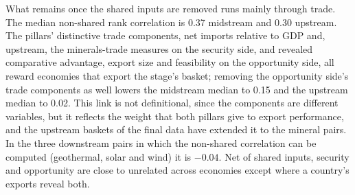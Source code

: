 What remains once the shared inputs are removed runs mainly through trade. The median non-shared
rank correlation is 0.37 midstream and 0.30 upstream. The pillars' distinctive trade components,
net imports relative to GDP and, upstream, the minerals-trade measures on the security side, and
revealed comparative advantage, export size and feasibility on the opportunity side, all reward
economies that export the stage's basket; removing the opportunity side's trade components as
well lowers the midstream median to 0.15 and the upstream median to 0.02. This link is not
definitional, since the components are different variables, but it reflects the weight that both
pillars give to export performance, and the upstream baskets of the final data have extended it
to the mineral pairs. In the three downstream pairs in which the non-shared correlation can be
computed (geothermal, solar and wind) it is $-0.04$. Net of shared inputs, security and
opportunity are close to unrelated across economies except where a country's exports reveal both.



